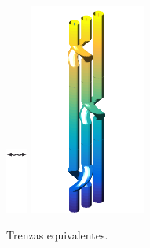 \documentclass[14pt]{extarticle}
\begin{document}
\begin{figure}[h!]
		\includegraphics[width=0.7cm]{itrenzas/flechac.png}
		\includegraphics[width=3.8cm]{itrenzas/6c4.png}
		\caption{Trenzas equivalentes.}
		\label{tren14} 
	\end{figure}
\end{document}

